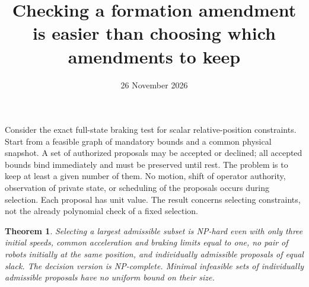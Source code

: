 \documentclass[11pt]{article}
\title{Checking a formation amendment is easier than choosing which amendments to keep}
\author{}
\date{26 November 2026}
\newtheorem{theorem}{Theorem}
\begin{document}
\maketitle

Consider the exact full-state braking test for scalar relative-position constraints. Start from a feasible graph of mandatory bounds and a common physical snapshot. A set of authorized proposals may be accepted or declined; all accepted bounds bind immediately and must be preserved until rest. The problem is to keep at least a given number of them. No motion, shift of operator authority, observation of private state, or scheduling of the proposals occurs during selection. Each proposal has unit value. The result concerns selecting constraints, not the already polynomial check of a fixed selection.

\begin{theorem}
Selecting a largest admissible subset is NP-hard even with only three initial speeds, common acceleration and braking limits equal to one, no pair of robots initially at the same position, and individually admissible proposals of equal slack. The decision version is NP-complete. Minimal infeasible sets of individually admissible proposals have no uniform bound on their size.
\end{theorem}
\end{document}
